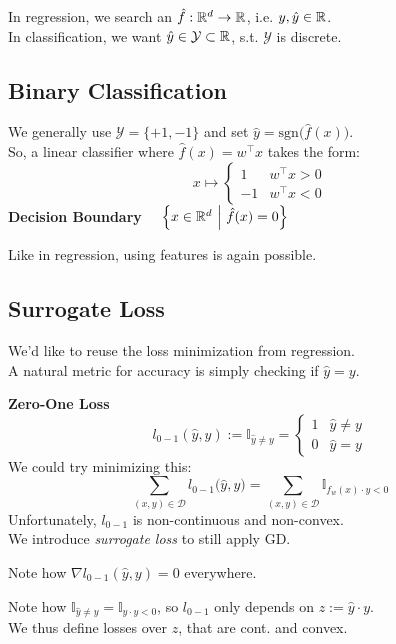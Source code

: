In regression, we search an $\hat{f}: \mathbb{R}^d \to \mathbb{R}$, i.e. $y,\hat{y} \in \mathbb{R}$.\\
In classification, we want $\hat{y} \in \mathcal{Y} \subset \mathbb{R}$, s.t. $\mathcal{Y}$ is discrete.

\subsection{Binary Classification}

We generally use $\mathcal{Y} = \{+1,-1\}$ and set $\hat{y} = \text{sgn}\bigl(\hat{f}(x)\bigr)$.\\
So, a linear classifier where $\hat{f}(x) = w^\top x$ takes the form:
$$
    x \mapsto \begin{cases}
        1   & w^\top x > 0 \\
        -1  & w^\top x < 0
    \end{cases}
$$
 \textbf{Decision Boundary} $\quad \Bigl\{ x \in \R^d \ \Big|\ \hat{f}(x) = 0 \Bigr\}$

Like in regression, using features is again possible.

\subsection{Surrogate Loss}

We'd like to reuse the loss minimization from regression.\\
A natural metric for accuracy is simply checking if $\hat{y} = y$.

 \textbf{Zero-One Loss}
$$
    l_{0-1}(\hat{y},y) := \mathbb{I}_{\hat{y}\neq y} = \begin{cases}
        1 & \hat{y} \neq y \\
        0 & \hat{y} = y
    \end{cases}
$$
We could try minimizing this:
$$
    \underset{(x,y) \in \mathcal{D}}{\sum} l_{0-1}\bigl( \hat{y},y \bigr) = \underset{(x,y) \in \mathcal{D}}{\sum} \mathbb{I}_{f_w(x) \cdot y < 0}
$$
Unfortunately, $l_{0-1}$ is non-continuous and non-convex.\\
We introduce \textit{surrogate loss} to still apply GD.

{\footnotesize
    \remark Note how $\nabla l_{0-1}(\hat{y},y) = 0$ everywhere.
}

Note how $\mathbb{I}_{\hat{y}\neq y} = \mathbb{I}_{\hat{y}\cdot y < 0}$, so $l_{0-1}$ only depends on $z := \hat{y}\cdot y$.\\
We thus define losses over $z$, that are cont. and convex.

